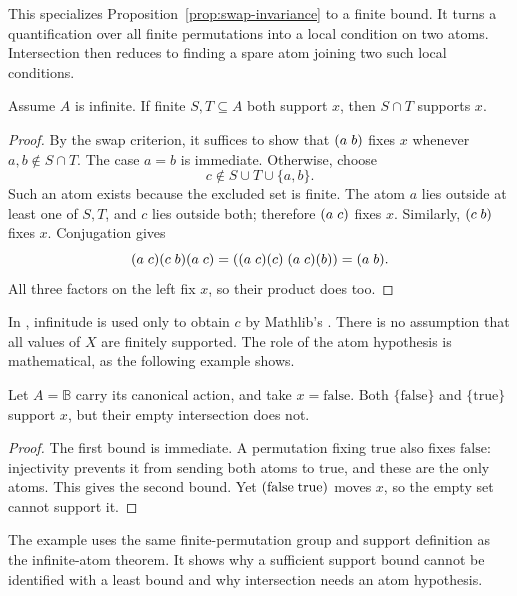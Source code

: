 This specializes Proposition~\ref{prop:swap-invariance} to a finite bound.
It turns a quantification
over all finite permutations into a local condition on two atoms.
Intersection then reduces to finding a spare atom joining two such local
conditions.

\begin{proposition}
\label{prop:finite-support-intersection}
Assume $A$ is infinite. If finite $S,T\subseteq A$ both support $x$,
then $S\cap T$ supports $x$.
\end{proposition}

\begin{proof}
By the swap criterion, it suffices to show that $(a\;b)$ fixes $x$
whenever $a,b\notin S\cap T$. The case $a=b$ is immediate. Otherwise,
choose
\[
  c\notin S\cup T\cup\{a,b\}.
\]
Such an atom exists because the excluded set is finite. The atom $a$ lies
outside at least one of $S,T$, and $c$ lies outside both; therefore
$(a\;c)$ fixes $x$. Similarly, $(c\;b)$ fixes $x$. Conjugation gives
\[
  (a\;c)(c\;b)(a\;c)
  =((a\;c)(c)\;(a\;c)(b))
  =(a\;b).
\]
All three factors on the left fix $x$, so their product does too.
\end{proof}

In , infinitude is used only to obtain $c$ by
Mathlib's . There is no assumption that all
values of $X$ are finitely supported. The role of the atom hypothesis is
mathematical, as the following example shows.

\begin{example}
\label{ex:finite-atom-intersection}
Let $A=\mathbb B$ carry its canonical action, and take
$x=\mathrm{false}$. Both $\{\mathrm{false}\}$ and
$\{\mathrm{true}\}$ support $x$, but their empty intersection does not.
\end{example}

\begin{proof}
The first bound is immediate. A permutation fixing $\mathrm{true}$ also
fixes $\mathrm{false}$: injectivity prevents it from sending both atoms to
$\mathrm{true}$, and these are the only atoms. This gives the second
bound. Yet $(\mathrm{false}\;\mathrm{true})$ moves $x$, so the empty
set cannot support it.
\end{proof}

The example uses the same finite-permutation group and support definition
as the infinite-atom theorem. It shows why a sufficient support bound
cannot be identified with a least bound and why intersection needs an
atom hypothesis.

